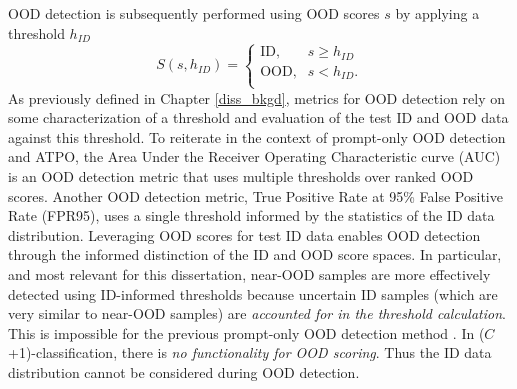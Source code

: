 OOD detection is subsequently performed using OOD scores $s$ by applying a threshold $h_{ID}$
\begin{equation}
  S(s, h_{ID}) =
  \begin{cases}
    \text{ID,} & \text{$s \geq h_{ID}$} \\
    \text{OOD,} & \text{$s < h_{ID}$}. \\
  \end{cases}
\end{equation}
As previously defined in Chapter \ref{diss_bkgd}, metrics for OOD detection rely on some characterization of a threshold and evaluation of the test ID and OOD data against this threshold. To reiterate in the context of prompt-only OOD detection and ATPO, the Area Under the Receiver Operating Characteristic curve (AUC) is an OOD detection metric that uses multiple thresholds over ranked OOD scores. Another OOD detection metric, True Positive Rate at 95\% False Positive Rate (FPR95), uses a single threshold informed by the statistics of the ID data distribution. Leveraging OOD scores for test ID data enables OOD detection through the informed distinction of the ID and OOD score spaces. In particular, and most relevant for this dissertation, near-OOD samples are more effectively detected using ID-informed thresholds because uncertain ID samples (which are very similar to near-OOD samples) are \textit{accounted for in the threshold calculation}. This is impossible for the previous prompt-only OOD detection method \cite{wang2024beyond}. In ($C$+1)-classification, there is \textit{no functionality for OOD scoring}. Thus the ID data distribution cannot be considered during OOD detection.
